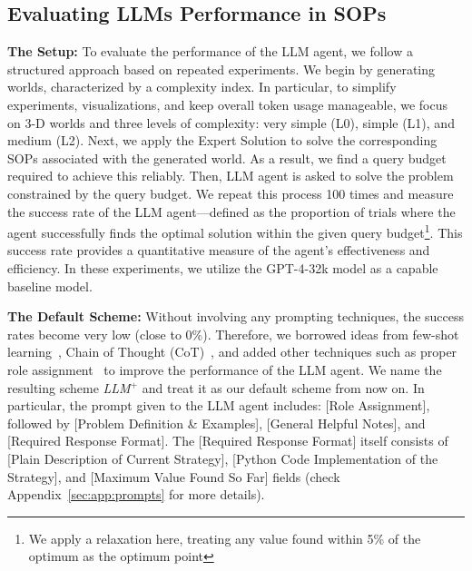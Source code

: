 \subsection{Evaluating LLMs Performance in SOPs}
\label{sec:part_2_evaluations}

\textbf{The Setup:}
To evaluate the performance of the LLM agent, we follow a structured approach based on repeated experiments. We begin by generating worlds, characterized by a complexity index. In particular, to simplify experiments, visualizations, and keep overall token usage manageable, we focus on 3-D worlds and three levels of complexity: very simple (L0), simple (L1), and medium (L2). Next, we apply the Expert Solution to solve the corresponding SOPs associated with the generated world. As a result, we find a query budget required to achieve this reliably. Then, LLM agent is asked to solve the problem constrained by the query budget.
We repeat this process 100 times and measure the success rate of the LLM agent—defined as the proportion of trials where the agent successfully finds the optimal solution within the given query budget\footnote{We apply a relaxation here, treating any value found within 5\% of the optimum as the optimum point}. This success rate provides a quantitative measure of the agent's effectiveness and efficiency. In these experiments, we utilize the GPT-4-32k model as a capable baseline model. 

\textbf{The Default Scheme:}
Without involving any prompting techniques, the success rates become very low (close to 0\%). Therefore, we borrowed ideas from few-shot learning~\cite{brown2020fewshot}, Chain of Thought (CoT)~\cite{wei2022cot}, and added other techniques such as proper role assignment~\cite{karpathy2023stateofgpt} to improve the performance of the LLM agent. We name the resulting scheme \textit{LLM$^+$} and treat it as our default scheme from now on.
In particular, the prompt given to the LLM agent includes: [Role Assignment], followed by [Problem Definition \& Examples], [General Helpful Notes], and [Required Response Format]. The [Required Response Format] itself consists of [Plain Description of Current Strategy], [Python Code Implementation of the Strategy], and [Maximum Value Found So Far] fields (check Appendix~\ref{sec:app:prompts} for more details).

